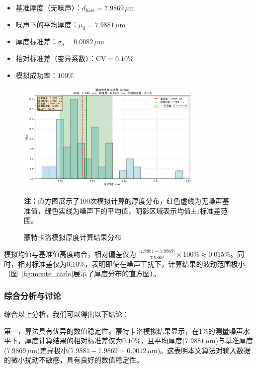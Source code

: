 \documentclass{ctexart} %
\begin{document}
\newcommand{\baseThickness}{7.9869}
\newcommand{\meanThickness}{7.9881}
\newcommand{\stdThickness}{0.0082}
\newcommand{\relativeStd}{0.10}

\begin{itemize}
    \item 基准厚度（无噪声）：$d_{\text{base}} = \baseThickness \, \mu\text{m}$
    \item 噪声下的平均厚度：$\mu_d = \meanThickness \, \mu\text{m}$
    \item 厚度标准差：$\sigma_d = \stdThickness \, \mu\text{m}$
    \item 相对标准差（变异系数）：$\text{CV} = \relativeStd\%$
    \item 模拟成功率：$100\%$
\end{itemize}

\begin{figure}[htbp]
    \centering
    \includegraphics[width=0.8\textwidth]{monte_carlo_result.png}
    \caption{蒙特卡洛模拟厚度计算结果分布}
    \label{fig:monte-carlo}
    \textbf{注：}直方图展示了100次模拟计算的厚度分布，红色虚线为无噪声基准值，绿色实线为噪声下的平均值，阴影区域表示均值±1标准差范围。
\end{figure}

模拟均值与基准值高度吻合，相对偏差仅为 $\frac{|{7.9881} - {7.9869}|}{{7.9869}} \times 100\% \approx {0.015}\%$。同时，相对标准差仅为$0.10\%$，表明即使在噪声干扰下，计算结果的波动范围极小（图~\ref{fig:monte_carlo}展示了厚度分布的直方图）。

\subsubsection{综合分析与讨论}

综合以上分析，我们可以得出以下结论：

第一，算法具有优异的数值稳定性。蒙特卡洛模拟结果显示，在$1\%$的测量噪声水平下，厚度计算结果的相对标准差仅为$\relativeStd\%$，且平均厚度($\meanThickness \, \mu\text{m}$)与基准厚度($\baseThickness \, \mu\text{m}$)差异极小(${\meanThickness - \baseThickness} = 0.0012 \, \mu\text{m}$)。这表明本文算法对输入数据的微小扰动不敏感，具有良好的数值稳定性。
\end{document}
